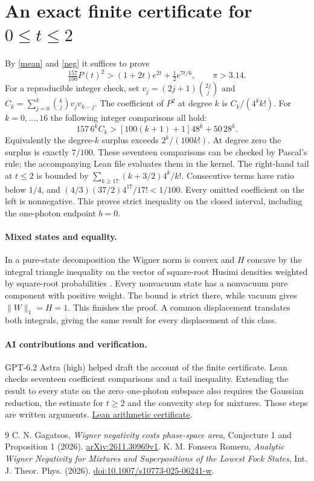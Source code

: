 \documentclass[10pt]{article}
\begin{document}
\section{An exact finite certificate for $0\le t\le2$}
By \eqref{mean} and \eqref{neg} it suffices to prove
\[
 \tfrac{157}{100}P(t)^2>(1+2t)e^{2t}+\tfrac12e^{7t/6},\qquad \pi>3.14.
\]
For a reproducible integer check, set $v_j=(2j+1){2j\choose j}$ and $C_k=\sum_{j=0}^k{k\choose j}v_jv_{k-j}$. The coefficient of $P^2$ at degree $k$ is $C_k/(4^k k!)$. For $k=0,\ldots,16$ the following integer comparisons all hold:
\[
 157\,6^k C_k > [100(k+1)+1]48^k+50\,28^k .
\]
Equivalently the degree-$k$ surplus exceeds $2^k/(100 k!)$. At degree zero the surplus is exactly $7/100$. These seventeen comparisons can be checked by Pascal's rule; the accompanying Lean file evaluates them in the kernel. The right-hand tail at $t\le2$ is bounded by $\sum_{k\ge17}(k+3/2)4^k/k!$. Consecutive terms have ratio below $1/4$, and $(4/3)(37/2)4^{17}/17!<1/100$. Every omitted coefficient on the left is nonnegative. This proves strict inequality on the closed interval, including the one-photon endpoint $b=0$.

\paragraph{Mixed states and equality.}
In a pure-state decomposition the Wigner norm is convex and $H$ concave by the integral triangle inequality on the vector of square-root Husimi densities weighted by square-root probabilities \cite{gag}. Every nonvacuum state has a nonvacuum pure component with positive weight. The bound is strict there, while vacuum gives $\|W\|_1=H=1$. This finishes the proof. A common displacement translates both integrals, giving the same result for every displacement of this class.

\paragraph{AI contributions and verification.} GPT-6.2 Astra (high) helped draft the account of the finite certificate. Lean checks seventeen coefficient comparisons and a tail inequality. Extending the result to every state on the zero--one-photon subspace also requires the Gaussian reduction, the estimate for $t\ge2$ and the convexity step for mixtures. Those steps are written arguments. \href{https://github.com/shunyaekam/oo-research/blob/a5cde30636afbfe599efab6bf8bbbafe9c640c22/formal/SingleRail.lean}{Lean arithmetic certificate}.

\begin{thebibliography}{9}
 C. N. Gagatsos, \emph{Wigner negativity costs phase-space area}, Conjecture 1 and Proposition 1 (2026). \href{https://arxiv.org/abs/2611.30969}{arXiv:2611.30969v1}.
 K. M. Fonseca Romero, \emph{Analytic Wigner Negativity for Mixtures and Superpositions of the Lowest Fock States}, Int. J. Theor. Phys. (2026). \href{https://doi.org/10.1007/s10773-025-06241-w}{doi:10.1007/s10773-025-06241-w}.
\end{thebibliography}
\end{document}
